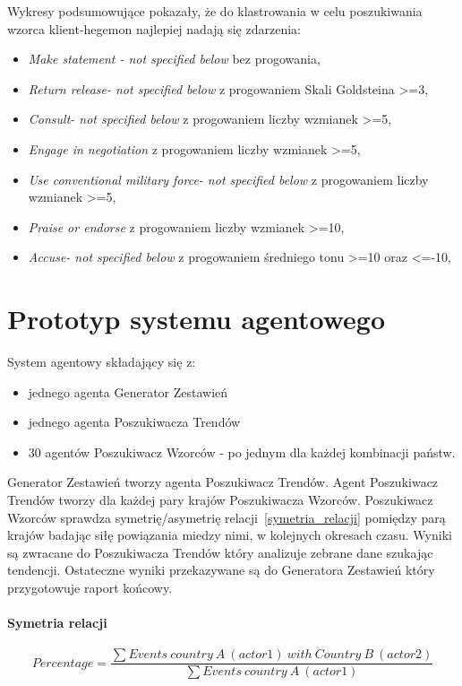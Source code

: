 \documentclass[11pt]{report}
\begin{document}
    Wykresy podsumowujące pokazały, że do klastrowania w celu poszukiwania wzorca klient-hegemon najlepiej nadają się zdarzenia:
    \begin{itemize}
        \item \textit{Make statement - not specified below} bez progowania,
        \item \textit{Return release- not specified below} z progowaniem Skali Goldsteina >=3,
        \item \textit{Consult- not specified below} z progowaniem liczby wzmianek >=5,
        \item \textit{Engage in negotiation} z progowaniem liczby wzmianek >=5,
        \item \textit{Use conventional military force- not specified below} z progowaniem liczby wzmianek >=5,
        \item \textit{Praise or endorse} z progowaniem liczby wzmianek >=10,
        \item \textit{Accuse- not specified below} z progowaniem średniego tonu >=10 oraz <=-10,
    \end{itemize}


    \section{Prototyp systemu agentowego}
    System agentowy składający się z:
    \begin{itemize}
        \item jednego agenta Generator Zestawień
        \item jednego agenta Poszukiwacza Trendów
        \item 30 agentów Poszukiwacz Wzorców - po jednym dla każdej kombinacji państw.
    \end{itemize}

    Generator Zestawień tworzy agenta Poszukiwacz Trendów.
    Agent Poszukiwacz Trendów tworzy dla każdej pary krajów Poszukiwacza Wzorców.
    Poszukiwacz Wzorców sprawdza symetrię/asymetrię relacji~\ref{symetria_relacji} pomiędzy parą krajów badając siłę powiązania miedzy nimi, w kolejnych okresach czasu.
    Wyniki są zwracane do Poszukiwacza Trendów który analizuje zebrane dane szukając tendencji.
    Ostateczne wyniki przekazywane są do Generatora Zestawień który przygotowuje raport końcowy.

    \paragraph{Symetria relacji}
    \[ Percentage = \frac
    {\sum{Events\ country\ A\ (actor 1)\ with\ Country\ B\ (actor 2)}}
    {\sum{Events\ country\ A\ (actor 1)}}
    \]
\end{document}
